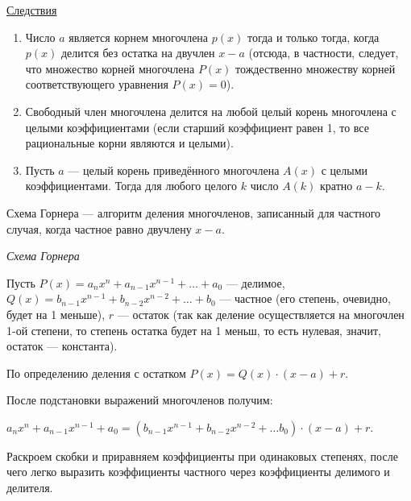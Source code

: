 \documentclass[bachelor, och, labwork]{shiza}
\begin{document}
\underline{Следствия}

\begin{enumerate}
    \item Число $a$ является корнем многочлена $p(x)$ тогда и только тогда, 
    когда $p(x)$ делится без остатка на двучлен $x-a$ (отсюда, в частности, 
    следует, что множество корней многочлена $P(x)$ тождественно множеству корней
    соответствующего уравнения $P(x)=0$).
    \item Свободный член многочлена делится на любой целый корень многочлена с 
    целыми коэффициентами (если старший коэффициент равен 1, то все рациональные 
    корни являются и целыми).
    \item Пусть $a$ --- целый корень приведённого многочлена $A(x)$ с целыми 
    коэффициентами. Тогда для любого целого $k$ число $A(k)$ кратно $a-k$.
\end{enumerate}

Схема Горнера --- алгоритм деления многочленов, записанный для частного случая, 
когда частное равно двучлену $x-a$.

\begin{center}
    \textit{Схема Горнера}
\end{center}

Пусть $P(x)=a_nx^n + a_{n-1}x^{n-1}+ \dotsc + a_0$ --- делимое,
$Q(x)=b_{n-1}x^{n-1}+b_{n-2}x^{n-2}+\dotsc+b_0$ --- частное (его степень,
очевидно, будет на 1 меньше), $r$ --- остаток (так как деление осуществляется на
многочлен 1-ой степени, то степень остатка будет на 1 меньш, то есть нулевая,
значит, остаток --- константа).

По определению деления с остатком $P(x) = Q(x) \cdot (x-a) + r$.

После подстановки выражений многочленов получим: 

$a_nx^n + a_{n-1}x^{n-1} + a_0 = \left( b_{n-1}x^{n-1} + b_{n-2}x^{n-2} + \dotsc b_0\right) \cdot (x-a) + r.$

Раскроем скобки и приравняем коэффициенты при одинаковых степенях, после чего 
легко выразить коэффициенты частного через коэффициенты делимого и делителя.
\end{document}
